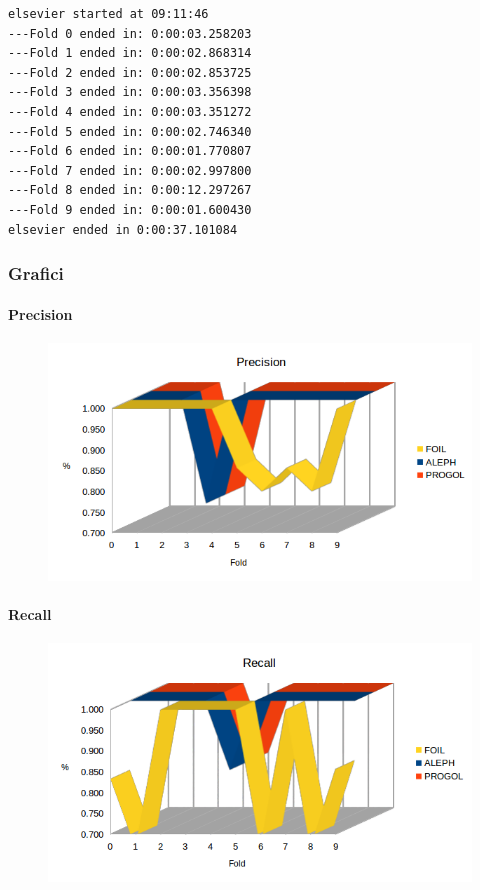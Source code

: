 \begin{verbatim}
elsevier started at 09:11:46
---Fold 0 ended in: 0:00:03.258203
---Fold 1 ended in: 0:00:02.868314
---Fold 2 ended in: 0:00:02.853725
---Fold 3 ended in: 0:00:03.356398
---Fold 4 ended in: 0:00:03.351272
---Fold 5 ended in: 0:00:02.746340
---Fold 6 ended in: 0:00:01.770807
---Fold 7 ended in: 0:00:02.997800
---Fold 8 ended in: 0:00:12.297267
---Fold 9 ended in: 0:00:01.600430
elsevier ended in 0:00:37.101084
\end{verbatim}

\subsubsection{Grafici}
\paragraph{Precision}
\begin{figure}[H]
	\includegraphics[width=1.1\textwidth]{img/datasetGraph/elsevier/precision.png}
	\label{Elsevier-Precision}
\end{figure}

\paragraph{Recall}
\begin{figure}[H]
	\includegraphics[width=1.1\textwidth]{img/datasetGraph/elsevier/recall.png}
	\label{Elsevier-Recall}
\end{figure}

